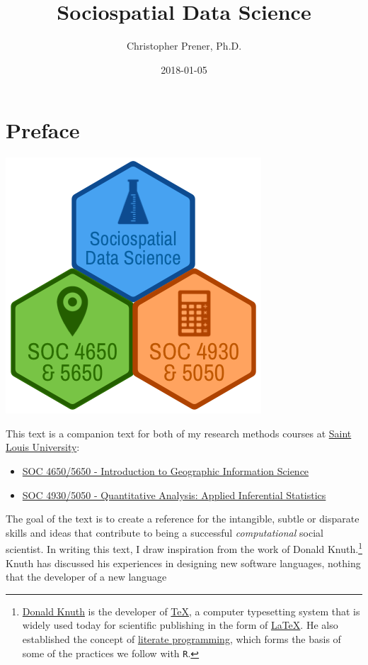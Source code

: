 \documentclass[]{book}
\title{Sociospatial Data Science}
\author{Christopher Prener, Ph.D.}
\date{2018-01-05}
\providecommand{\tightlist}{%
  \setlength{\itemsep}{0pt}\setlength{\parskip}{0pt}}
\let\rmarkdownfootnote\footnote%
\def\footnote{\protect\rmarkdownfootnote}
\theoremstyle{definition}
\theoremstyle{definition}
\theoremstyle{definition}
\theoremstyle{remark}
\begin{document}
\maketitle

{
\setcounter{tocdepth}{1}
\tableofcontents
}
\hypertarget{preface}{\chapter*{Preface}\label{preface}}

\begin{center}\includegraphics[width=0.4\linewidth]{images/SSDSBookBanner} \end{center}

This text is a companion text for both of my research methods courses at
\href{https://slu.edu}{Saint Louis University}:

\begin{itemize}
\tightlist
\item
  \href{https://slu-soc5650.github.io}{SOC 4650/5650 - Introduction to
  Geographic Information Science}
\item
  \href{https://slu-soc5050.github.io}{SOC 4930/5050 - Quantitative
  Analysis: Applied Inferential Statistics}
\end{itemize}

The goal of the text is to create a reference for the intangible, subtle
or disparate skills and ideas that contribute to being a successful
\emph{computational} social scientist. In writing this text, I draw
inspiration from the work of Donald Knuth.\footnote{\href{https://en.wikipedia.org/wiki/Donald_Knuth}{Donald
  Knuth} is the developer of
  \href{https://en.wikipedia.org/wiki/TeX}{TeX}, a computer typesetting
  system that is widely used today for scientific publishing in the form
  of \href{https://en.wikipedia.org/wiki/LaTeX}{LaTeX}. He also
  established the concept of
  \href{https://en.wikipedia.org/wiki/Literate_programming}{literate
  programming}, which forms the basis of some of the practices we follow
  with \texttt{R}.} Knuth has discussed his experiences in designing new
software languages, nothing that the developer of a new language
\end{document}
